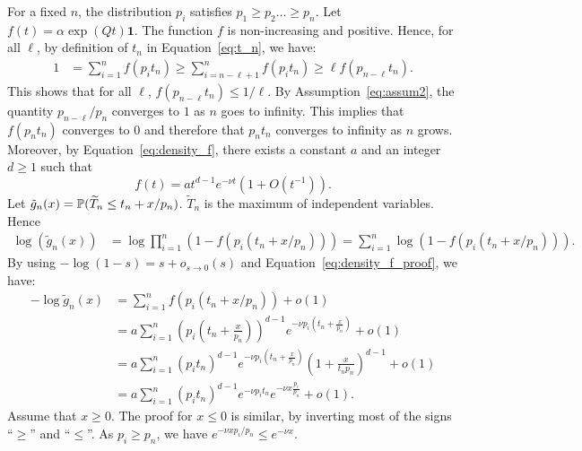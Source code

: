 \documentclass{aptpub}
\newcommand\proba[1]{\mathchoice{\bproba{#1}}{\sproba{#1}}{\sproba{#1}}{\sproba{#1}}}
\newcommand\bproba[1]{\mathbb{P}\left(#1\right)}
\newcommand\sproba[1]{\mathbb{P}(#1)}
\begin{document}
  
  For a fixed $n$, the distribution $p_i$ satisfies
  $p_1\ge p_2\dots \ge p_n$. Let $f(t)=\alpha\exp(Qt)\mathbf{1}$. The
  function $f$ is non-increasing and positive. Hence, for all $\ell$, by
  definition of $t_n$ in Equation~\eqref{eq:t_n}, we have:
  \begin{align*}
    1 &= \sum_{i=1}^n f(p_it_n) \ge \sum_{i=n-\ell+1}^n f(p_it_n) \ge
        \ell f(p_{n-\ell}t_n).
  \end{align*}
  This shows that for all $\ell$, $f(p_{n-\ell}t_n)\le 1/\ell$.  By
  Assumption~\eqref{eq:assum2}, the quantity $p_{n-\ell}/p_n$
  converges to $1$ as $n$ goes to infinity. This implies that
  $f(p_{n}t_n)$ converges to $0$ and therefore that $p_nt_n$ converges
  to infinity as $n$ grows.
  Moreover, by
  Equation~\eqref{eq:density_f}, there exists a constant $a$ and an
  integer $d\ge1$ such that 
  \begin{equation}
    \label{eq:density_f_proof}
    f(t)=at^{d-1}e^{-\nu t}(1+O(t^{-1})).
  \end{equation}
  Let $\tilde g_n(x) = \proba{\widetilde{T}_n\le t_n+x/p_n}$.
  $\tilde{T}_n$ is the maximum of independent variables. Hence
  \begin{align*}
    \log(\tilde g_n(x)) &= \log \prod_{i=1}^n (1-f(p_i(t_n+x/p_n)))
                         = \sum_{i=1}^n
           \log(1- f(p_i(t_n+x/p_n))).
  \end{align*}
  By using $-\log(1-s)=s+o_{s\to0}(s)$ and
  Equation~\eqref{eq:density_f_proof}, we have:
  \begin{align}
    -\log \tilde g_n(x) 
    &= \sum_{i=1}^n f(p_i(t_n+x/p_n)) + o(1)\nonumber\\
    &= a\sum_{i=1}^n  (p_{i} (t_n+\frac{x}{p_n}))^{d-1} e^{-\nu
      p_i(t_n+\frac{x}{p_n})} + o(1)\nonumber\\
    &= a\sum_{i=1}^n (p_it_n)^{d-1} e^{-\nu p_i
      (t_n+\frac{x}{p_n})}(1+\frac{x}{t_np_n})^{d-1} + o(1)\nonumber\\
    &= a\sum_{i=1}^n (p_it_n)^{d-1} e^{-\nu p_i t_n} e^{-\nu x\frac{p_i}{p_n}}
      + o(1).
      \label{eq:g_tilde}
  \end{align}
  Assume that $x\ge0$.  The proof for $x\le0$ is similar, by
  inverting most of the signs ``$\ge$'' and ``$\le$''.
  As $p_i\ge p_n$, we have $e^{-\nu x p_i /p_n} \le e^{-\nu x}$.
  
\end{document}
